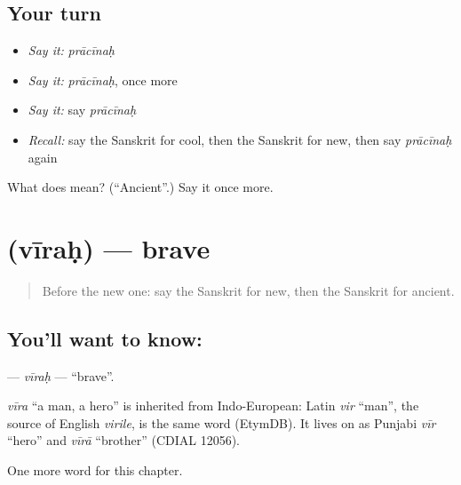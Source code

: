 \subsection*{Your turn}
\begin{itemize}
\raggedright
  \item \emph{Say it:} \emph{prācīnaḥ}
  \item \emph{Say it:} \emph{prācīnaḥ}, once more
  \item \emph{Say it:} say \emph{prācīnaḥ}
  \item \emph{Recall:} say the Sanskrit for cool, then the Sanskrit for new, then say \emph{prācīnaḥ} again
\end{itemize}

\begin{tcolorbox}[breakable,colback=teal!4,colframe=teal!35!black,title={Before you move on}]
What does  mean? (\textquotedblleft{}Ancient\textquotedblright{}.) Say it once more.
\end{tcolorbox}
\section[\texorpdfstring{\sk{वीरः} (vīraḥ)}{वीरः (vīraḥ)}]{ (vīraḥ) — brave}

\label{lesson:SA-C129-virah}



\begin{quote}
Before the new one: say the Sanskrit for new, then the Sanskrit for ancient.
\end{quote}

\subsection*{You'll want to know: }
\textbf{} — \emph{vīraḥ} — \textquotedblleft{}brave\textquotedblright{}.

\begin{cousinweb}
\emph{vīra} \textquotedblleft{}a man, a hero\textquotedblright{} is inherited from Indo-European: Latin \emph{vir} \textquotedblleft{}man\textquotedblright{}, the source of English \emph{virile}, is the same word (EtymDB). It lives on as Punjabi \emph{vīr} \textquotedblleft{}hero\textquotedblright{} and \emph{vīrā} \textquotedblleft{}brother\textquotedblright{} (CDIAL 12056).
\end{cousinweb}

\begin{grammarlens}[title={What you've built}]
One more word for this chapter.
\end{grammarlens}

